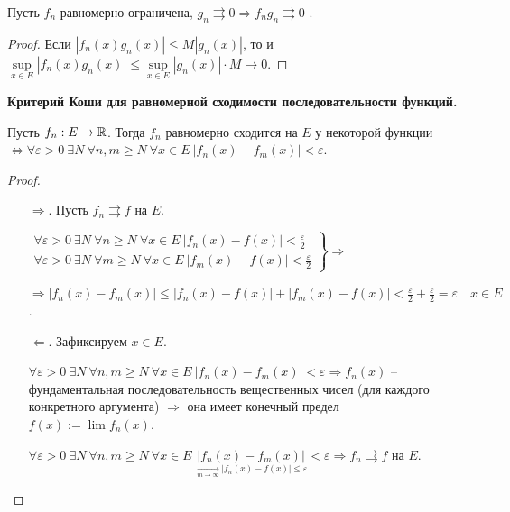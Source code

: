 \begin{theorem}
    Пусть $f_n$ равномерно ограничена, $g_n\rightrightarrows 0\Rightarrow f_ng_n\rightrightarrows 0$ .
\end{theorem}

\begin{proof}
    Если $|f_n(x)g_n(x)|\leq M|g_n(x)|$, то и $\sup\limits_{x\in E}|f_n(x)g_n(x)|\leq \sup\limits_{x\in E}|g_n(x)|\cdot M\rightarrow 0$.
\end{proof}

\begin{theorem}
    \textbf{Критерий Коши для равномерной сходимости последовательности функций.}

    Пусть $f_n:E\rightarrow \mathbb{R}$. Тогда $f_n$ равномерно сходится на $E$ у некоторой функции $\Leftrightarrow \forall \varepsilon > 0\ \exists N\ \forall n, m\geq N\ \forall x\in E\ |f_n(x)-f_m(x)|<\varepsilon$.
\end{theorem}

\begin{proof}~
    \begin{enumerate}
        \item[$\Rightarrow$.] Пусть $f_n\rightrightarrows f$ на $E$.

        $\left.\begin{array}{l}
           \forall \varepsilon > 0\ \exists N\ \forall n\geq N\ \forall x\in E\ |f_n(x)-f(x)|<\frac{\varepsilon}{2}    \\
             \forall \varepsilon > 0\ \exists N\ \forall m\geq N\ \forall x\in E\ |f_m(x)-f(x)|<\frac{\varepsilon}{2}
        \end{array}\right\}\Rightarrow$

        $\Rightarrow |f_n(x)-f_m(x)|\leq |f_n(x)-f(x)|+ |f_m(x)-f(x)|<\frac{\varepsilon}{2} + \frac{\varepsilon}{2} = \varepsilon\quad x\in E$.

        \item[$\Leftarrow$.] Зафиксируем $x\in E$.

        $\forall \varepsilon > 0\ \exists N\ \forall n, m\geq N\ \forall x\in E\ |f_n(x)-f_m(x)|<\varepsilon\Rightarrow f_n(x)$ – фундаментальная последовательность вещественных чисел (для каждого конкретного аргумента) $\Rightarrow$ она имеет конечный предел $f(x):=\lim f_n(x)$.

        $\forall \varepsilon > 0\ \exists N\ \forall n, m\geq N\ \forall x\in E\ \underset{\underset{m\rightarrow \infty}{\rightarrow}|f_n(x)-f(x)|\leq \varepsilon}{|f_n(x)-f_m(x)|}<\varepsilon\Rightarrow f_n \rightrightarrows f$ на $E$.
    \end{enumerate}
\end{proof}

